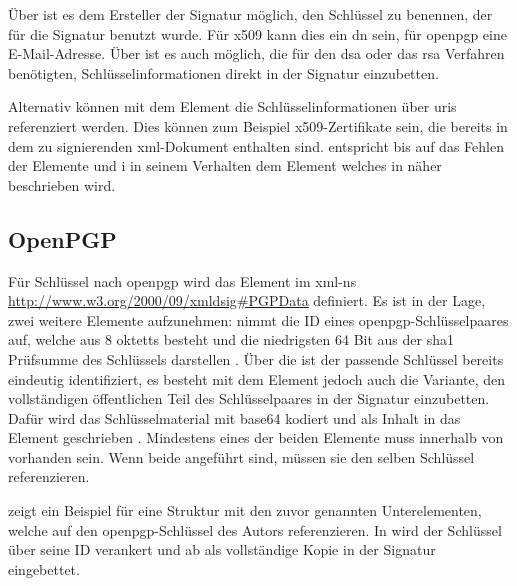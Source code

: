 Über  ist es dem Ersteller der Signatur möglich, den Schlüssel zu benennen, der für die Signatur benutzt wurde. Für \gls{x509} kann dies ein
\gls{dn} sein, für \gls{openpgp} eine E-Mail-Adresse. Über  ist es auch möglich, die für den \gls{dsa} oder das \gls{rsa} Verfahren
benötigten, Schlüsselinformationen direkt in der Signatur einzubetten.  

Alternativ können mit dem Element  die Schlüsselinformationen über \glspl{uri} referenziert werden. Dies können zum Beispiel
\gls{x509}-Zertifikate sein, die bereits in dem zu signierenden \gls{xml}-Dokument enthalten sind.  entspricht bis auf
das Fehlen der Elemente  und i in seinem Verhalten dem Element  welches in 
 näher beschrieben wird.

\subsection{OpenPGP}
Für Schlüssel nach \gls{openpgp} wird das Element  im \gls{xml-ns} \url{http://www.w3.org/2000/09/xmldsig#PGPData} definiert. Es ist in der
Lage, zwei weitere Elemente aufzunehmen:  nimmt die ID eines \gls{openpgp}-Schlüsselpaares auf, welche aus 8 \glspl{oktett} besteht und die
niedrigsten 64 Bit aus der \gls{sha1} Prüfsumme des Schlüssels darstellen \cite{openpgp:ietf}. Über die  ist der passende Schlüssel bereits eindeutig
identifiziert, es besteht mit dem Element  jedoch auch die Variante, den vollständigen öffentlichen Teil des Schlüsselpaares in der
Signatur einzubetten. Dafür wird das Schlüsselmaterial mit \gls{base64} kodiert und als Inhalt in das Element geschrieben \cite{xml-dsig:w3c}. Mindestens eines
der beiden Elemente muss innerhalb von  vorhanden sein. Wenn beide angeführt sind, müssen sie den selben Schlüssel referenzieren.

 zeigt ein Beispiel für eine Struktur mit den zuvor genannten Unterelementen, welche auf den \gls{openpgp}-Schlüssel des Autors
referenzieren. In  wird der Schlüssel über seine ID verankert und ab  als
vollständige Kopie in der Signatur eingebettet.



